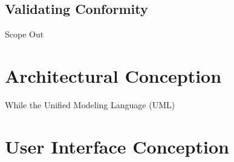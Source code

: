 \subsection{Validating Conformity}
Scope Out

\section{Architectural Conception}
While the Unified Modeling Language (UML) \parencite[cf.]{}
\subsection{}


\section{User Interface Conception}


